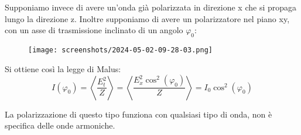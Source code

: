Supponiamo invece di avere un'onda già polarizzata in direzione x che si propaga lungo la direzione z. Inoltre supponiamo di avere un polarizzatore nel piano xy, con un asse di trasmissione inclinato di un angolo \(\varphi _0\):
\begin{figure}[H]
	\centering
	\texttt{[image: screenshots/2024-05-02-09-28-03.png]}
\end{figure}
\begin{formula}
	Si ottiene così la legge di Malus:
	\begin{equation}
		I(\varphi _0) = \left\langle \frac{E_t ^{2} }{Z} \right\rangle = \left\langle \frac{E_x ^{2} \cos ^{2} (\varphi _0)}{Z} \right\rangle
		= I_0 \cos ^{2} (\varphi _0)
	\end{equation}
\end{formula}
\begin{note}
	La polarizzazione di questo tipo funziona con qualsiasi tipo di onda, non è specifica delle onde armoniche.
\end{note}

